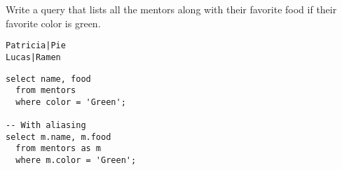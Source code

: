 \begin{blocksection}
\question Write a query that lists all the mentors along with their favorite food if their favorite color is green.

\begin{lstlisting}
Patricia|Pie
Lucas|Ramen
\end{lstlisting}

\begin{solution}[1in]
\begin{lstlisting}
select name, food
  from mentors
  where color = 'Green';
  
-- With aliasing
select m.name, m.food
  from mentors as m
  where m.color = 'Green';
\end{lstlisting}
\end{solution}
\end{blocksection}
